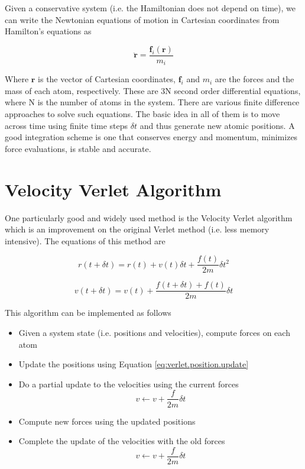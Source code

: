 \documentclass[aip,jcp,preprint,superscriptaddress,floatfix]{revtex4-1}
\begin{document}
Given a conservative system (i.e. the Hamiltonian does not depend on time), 
we can write the Newtonian equations of motion in Cartesian coordinates
from Hamilton's
equations as

\begin{equation}
	\ddot{\mathbf{r}} = \frac{\mathbf{f}_i\left( \mathbf{r} \right) }{\textit{m}_i}
\end{equation}

Where $\mathbf{r}$ is the vector of Cartesian coordinates, $\mathbf{f}_i$ and
 $\textit{m}_i$ are the forces and the mass of each atom, respectively.
These are 3N second order differential equations, where N is the number 
of atoms in the system. There are various finite difference approaches to solve
such equations. The basic idea in all of them is to move 
across time using finite time steps $\delta t$ and thus generate new atomic
positions. A good integration scheme is one that conserves energy 
and momentum, minimizes force evaluations, is stable and accurate. 

\section{Velocity Verlet Algorithm}

One particularly good and widely used method is the Velocity Verlet algorithm
which is an improvement on the original Verlet method (i.e. less memory
intensive). The equations of this method are

\begin{equation}
	r \left( t + \delta t \right) = r \left( t \right) + v \left( t \right) \delta t + \frac{f \left(t \right) }{2 m} \delta t ^2
\label{eq:verlet.position.update}
\end{equation}

\begin{equation}
	v \left( t + \delta t \right) = v \left( t \right) + \frac{f \left( t + \delta t \right) + f \left(t \right) }{2m} \delta t
\end{equation}

This algorithm can be implemented as follows

\begin{itemize}
	\item Given a system state (i.e. positions and velocities), 
		compute forces on each atom
	\item Update the positions using Equation \ref{eq:verlet.position.update}
	\item Do a partial update to the velocities using the current forces
		\begin{equation}
			v \leftarrow v + \frac{f}{2m} \delta t
		\end{equation}
	\item Compute new forces using the updated positions
	\item Complete the update of the velocities with the old forces
		\begin{equation}
			v \leftarrow v + \frac{f}{2m} \delta t
		\end{equation}

\end{itemize}
\end{document}
